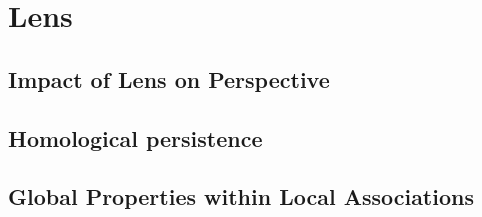 \section{Lens}
\subsection{Impact of Lens on Perspective}
\subsection{Homological persistence}
\subsection{Global Properties within Local Associations}

